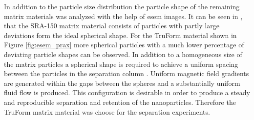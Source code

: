 In addition to the particle size distribution the particle shape of the remaining matrix materials was analyzed with the help of \gls{esem} images. It can be seen in \cite{AndreMaster}, that the SRA-150 matrix material consists of particles with partly large deviations form the ideal spherical shape. For the TruForm material shown in Figure \ref{fig:esem_prax} more spherical particles with a much lower percentage of deviating particle shapes can be observed. In addition to a homogeneous size of the matrix particles a spherical shape is required to achieve a uniform spacing between the particles in the separation column \cite{miltenyi1997magnetic}. Uniform magnetic field gradients are generated within the gaps between the spheres and a substantially uniform fluid flow is produced. This configuration is desirable in order to produce a steady and reproducible separation and retention of the nanoparticles. Therefore the TruForm matrix material was choose for the separation experiments.          


